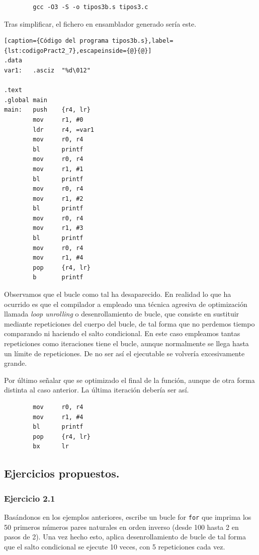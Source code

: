 \begin{lstlisting}
        gcc -O3 -S -o tipos3b.s tipos3.c
\end{lstlisting}

Tras simplificar, el fichero en ensamblador generado sería este.

\begin{lstlisting}[caption={Código del programa tipos3b.s},label={lst:codigoPract2_7},escapeinside={@}{@}]
.data
var1:   .asciz  "%d\012"

.text
.global main
main:   push    {r4, lr}
        mov     r1, #0
        ldr     r4, =var1
        mov     r0, r4
        bl      printf
        mov     r0, r4
        mov     r1, #1
        bl      printf
        mov     r0, r4
        mov     r1, #2
        bl      printf
        mov     r0, r4
        mov     r1, #3
        bl      printf
        mov     r0, r4
        mov     r1, #4
        pop     {r4, lr}
        b       printf
\end{lstlisting}

Observamos que el bucle como tal ha desaparecido. En realidad lo que ha ocurrido
es que el compilador a empleado una técnica agresiva de optimización llamada
{\it loop unrolling} o desenrollamiento de bucle, que consiste en sustituir
mediante repeticiones del cuerpo del bucle, de tal forma que no perdemos tiempo
comparando ni haciendo el salto condicional. En este caso empleamos tantas repeticiones
como iteraciones tiene el bucle, aunque normalmente se llega hasta un límite de
repeticiones. De no ser así el ejecutable se volvería excesivamente grande.

Por último señalar que se optimizado el final de la función, aunque de otra forma
distinta al caso anterior. La última iteración debería ser así.

\begin{lstlisting}
        mov     r0, r4
        mov     r1, #4
        bl      printf
        pop     {r4, lr}
        bx      lr
\end{lstlisting}

\subsection{Ejercicios propuestos.}

\subsubsection{Ejercicio 2.1}
Basándonos en los ejemplos anteriores, escribe un bucle for {\tt for} que imprima
los 50 primeros números pares naturales en orden inverso (desde 100 hasta 2 en pasos
de 2). Una vez hecho esto, aplica desenrollamiento de bucle de tal forma
que el salto condicional se ejecute 10 veces, con 5 repeticiones cada vez.

